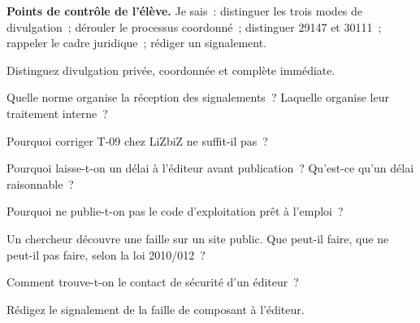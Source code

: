 \begin{boxinfo}
\textbf{Points de contrôle de l'élève.} Je sais~: distinguer les trois modes
de divulgation~; dérouler le processus coordonné~; distinguer 29147 et
30111~; rappeler le cadre juridique~; rédiger un signalement.
\end{boxinfo}

\bigskip

\begin{boxexo}[title={\ding{45}\quad Exercice~24.1. Trois modes \niveaubase}]
Distinguez divulgation privée, coordonnée et complète immédiate.
\end{boxexo}

\begin{boxexo}[title={\ding{45}\quad Exercice~24.2. Normes \niveaubase}]
Quelle norme organise la réception des signalements~? Laquelle organise leur
traitement interne~?
\end{boxexo}

\begin{boxexo}[title={\ding{45}\quad Exercice~24.3. Devoir \niveaubase}]
Pourquoi corriger T-09 chez LiZbiZ ne suffit-il pas~?
\end{boxexo}

\begin{boxexo}[title={\ding{45}\quad Exercice~24.4. Délai \niveaumoyen}]
Pourquoi laisse-t-on un délai à l'éditeur avant publication~? Qu'est-ce qu'un
délai raisonnable~?
\end{boxexo}

\begin{boxexo}[title={\ding{45}\quad Exercice~24.5. Pas d'arme \niveaumoyen}]
Pourquoi ne publie-t-on pas le code d'exploitation prêt à l'emploi~?
\end{boxexo}

\begin{boxexo}[title={\ding{45}\quad Exercice~24.6. Droit \niveaumoyen}]
Un chercheur découvre une faille sur un site public. Que peut-il faire, que
ne peut-il pas faire, selon la loi 2010/012~?
\end{boxexo}

\begin{boxexo}[title={\ding{45}\quad Exercice~24.7. Contact \niveaumoyen}]
Comment trouve-t-on le contact de sécurité d'un éditeur~?
\end{boxexo}

\begin{boxexo}[title={\ding{45}\quad Exercice~24.8. Signalement \niveaumoyen}]
Rédigez le signalement de la faille de composant à l'éditeur.
\end{boxexo}

